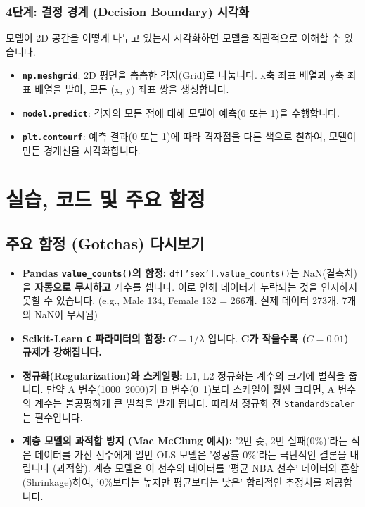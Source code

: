 \documentclass[11pt,a4paper]{book}
\theoremstyle{definition}
\begin{document}
\subsubsection*{4단계: 결정 경계 (Decision Boundary) 시각화}
모델이 2D 공간을 어떻게 나누고 있는지 시각화하면 모델을 직관적으로 이해할 수 있습니다.

\begin{itemize}
    \item \textbf{\texttt{np.meshgrid}}: 2D 평면을 촘촘한 격자(Grid)로 나눕니다. x축 좌표 배열과 y축 좌표 배열을 받아, 모든 (x, y) 좌표 쌍을 생성합니다.
    \item \textbf{\texttt{model.predict}}: 격자의 모든 점에 대해 모델이 예측(0 또는 1)을 수행합니다.
    \item \textbf{\texttt{plt.contourf}}: 예측 결과(0 또는 1)에 따라 격자점을 다른 색으로 칠하여, 모델이 만든 경계선을 시각화합니다.
\end{itemize}


\section{실습, 코드 및 주요 함정}

\subsection{주요 함정 (Gotchas) 다시보기}
\begin{warningbox}
\begin{itemize}
    \item \textbf{Pandas \texttt{value\_counts()}의 함정:}
    \texttt{df['sex'].value\_counts()}는 NaN(결측치)을 \textbf{자동으로 무시하고} 개수를 셉니다. 이로 인해 데이터가 누락되는 것을 인지하지 못할 수 있습니다. (e.g., Male 134, Female 132 = 266개. 실제 데이터 273개. 7개의 NaN이 무시됨)
    
    \item \textbf{Scikit-Learn \texttt{C} 파라미터의 함정:}
    $C = 1 / \lambda$ 입니다. \textbf{C가 작을수록 ($C=0.01$) 규제가 강해집니다.}
    
    \item \textbf{정규화(Regularization)와 스케일링:}
    L1, L2 정규화는 계수의 크기에 벌칙을 줍니다. 만약 A 변수(1000~2000)가 B 변수(0~1)보다 스케일이 훨씬 크다면, A 변수의 계수는 불공평하게 큰 벌칙을 받게 됩니다. 따라서 정규화 전 \texttt{StandardScaler}는 필수입니다.
    
    \item \textbf{계층 모델의 과적합 방지 (Mac McClung 예시):}
    '2번 슛, 2번 실패(0\%)'라는 적은 데이터를 가진 선수에게 일반 OLS 모델은 '성공률 0\%'라는 극단적인 결론을 내립니다 (과적합).
    계층 모델은 이 선수의 데이터를 '평균 NBA 선수' 데이터와 혼합(Shrinkage)하여, '0\%보다는 높지만 평균보다는 낮은' 합리적인 추정치를 제공합니다.
\end{itemize}
\end{warningbox}
\end{document}
